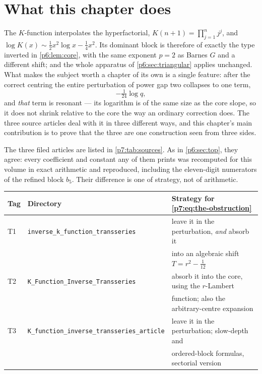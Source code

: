 \documentclass[11pt,a4paper,oneside]{book}
\theoremstyle{plain}
\theoremstyle{definition}
\theoremstyle{remark}
\begin{document}
\section{What this chapter does}
\label{p7:sec:intro}

The $K$-function interpolates the hyperfactorial,
$K(n+1)=\prod_{j=1}^{n}j^{j}$, and
$\log K(x)\sim\tfrac12x^{2}\log x-\tfrac14x^{2}$.  Its dominant block is
therefore of exactly the type inverted in \cref{p6:lem:core}, with the same
exponent $p=2$ as Barnes $G$ and a different shift; and the whole apparatus of
\cref{p6:sec:triangular} applies unchanged.  What makes the subject worth a
chapter of its own is a single feature: after the correct centring the entire
perturbation of power gap two collapses to one term,
\begin{equation}\label{p7:eq:the-obstruction}
 -\tfrac1{24}\log q,
\end{equation}
and \emph{that} term is resonant --- its logarithm is of the same size as the
core slope, so it does not shrink relative to the core the way an ordinary
correction does.  The three source articles deal with it in three different
ways, and this chapter's main contribution is to prove that the three are one
construction seen from three sides.

\begin{sourcebox}
The three filed articles are listed in \cref{p7:tab:sources}.  As in
\cref{p6:sec:top}, they agree: every coefficient and constant any of them
prints was recomputed for this volume in exact arithmetic and reproduced,
including the eleven-digit numerators of the refined block $b_5$.  Their
difference is one of strategy, not of arithmetic.

\begin{center}\small
\begin{tabular}{@{}lll@{}}
\toprule
Tag & Directory & Strategy for \eqref{p7:eq:the-obstruction}\\
\midrule
T1 & \texttt{inverse\_\allowbreak k\_\allowbreak function\_\allowbreak transseries} &
 leave it in the perturbation, \emph{and} absorb it\\
 & & into an algebraic shift $T=r^{2}-\tfrac1{12}$\\
T2 & \texttt{K\_\allowbreak Function\_\allowbreak Inverse\_\allowbreak Transseries} &
 absorb it into the core, using the $r$-Lambert\\
 & & function; also the arbitrary-centre expansion\\
T3 & \texttt{K\_\allowbreak function\_\allowbreak inverse\_\allowbreak transseries\_\allowbreak article} &
 leave it in the perturbation; slow-depth and\\
 & & ordered-block formulas, sectorial version\\
\bottomrule
\end{tabular}
\end{center}
\end{sourcebox}
\end{document}
